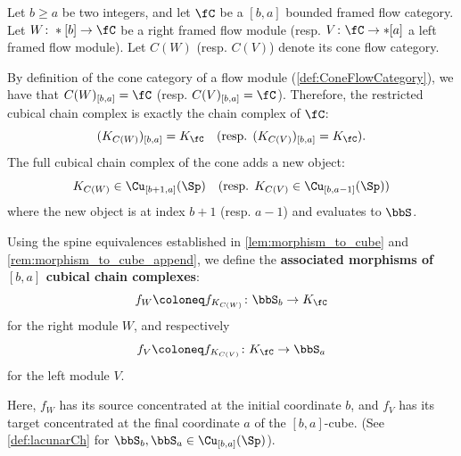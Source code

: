 \begin{defn}\label{def:module_morphisms}
Let $b \geq a$ be two integers, and let $\fC$ be a $[b, a]$ bounded framed flow category. Let $W \colon *[b] \to \fC$ be a right framed flow module (resp. $V \colon \fC \to *[a]$ a left framed flow module). Let $C(W)$ (resp. $C(V)$) denote its cone flow category.

By definition of the cone category of a flow module (\cref{def:ConeFlowCategory}), we have that $C(W)_{[b,a]} = \fC$ (resp. $C(V)_{[b,a]} = \fC$). Therefore, the restricted cubical chain complex is exactly the chain complex of $\fC$:
\[
    (K_{C(W)})_{[b,a]} = K_{\fC} \quad (\text{resp. } (K_{C(V)})_{[b,a]} = K_{\fC}).
\]
The full cubical chain complex of the cone adds a new object:
\[
    K_{C(W)} \in \Cu_{[b+1, a]}(\Sp) \quad (\text{resp. } K_{C(V)} \in \Cu_{[b, a-1]}(\Sp))
\]
where the new object is at index $b+1$ (resp. $a-1$) and evaluates to $\bbS$.

Using the spine equivalences established in \cref{lem:morphism_to_cube} and \cref{rem:morphism_to_cube_append}, we define the \textbf{associated morphisms of $[b,a]$ cubical chain complexes}:
\begin{equation*}
    f_W \coloneq f_{K_{C(W)}} \colon \bbS_{b} \to K_{\fC}
\end{equation*}
for the right module $W$, and respectively
\begin{equation*}
    f_V \coloneq f_{K_{C(V)}} \colon K_{\fC} \to \bbS_{a}
\end{equation*}
for the left module $V$.

Here, $f_W$ has its source concentrated at the initial coordinate $b$, and $f_V$ has its target concentrated at the final coordinate $a$ of the $[b,a]$-cube. (See \cref{def:lacunarCh} for $\bbS_{b}, \bbS_{a} \in \Cu_{[b,a]}(\Sp)$).
\end{defn}